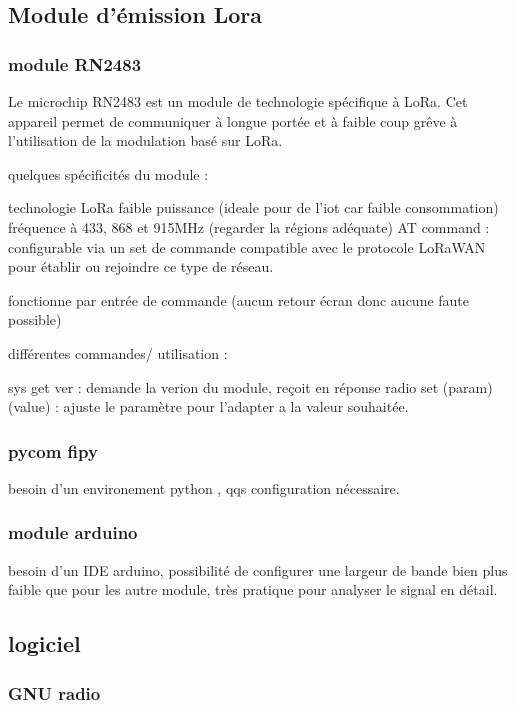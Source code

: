 \subsection{Module d'émission Lora}

\subsubsection{module RN2483}

Le microchip RN2483 est un module de technologie spécifique à LoRa. Cet appareil permet de communiquer à longue portée et à faible coup grêve à l'utilisation de la modulation basé sur LoRa.

quelques spécificités du module :

technologie LoRa
faible puissance (ideale pour de l'iot car faible consommation)
fréquence à 433, 868 et 915MHz (regarder la régions adéquate)
AT command : configurable via un set de commande
compatible avec le protocole LoRaWAN pour établir ou rejoindre ce type de réseau.

fonctionne par entrée de commande (aucun retour écran donc aucune faute possible)

différentes commandes/ utilisation :

sys get ver : demande la verion du module, reçoit en réponse 
radio set (param) (value) : ajuste le paramètre pour l'adapter a la valeur souhaitée.

\subsubsection{pycom fipy}

besoin  d'un environement python , qqs configuration nécessaire.

\subsubsection{module arduino}

besoin d'un IDE arduino, possibilité de configurer une largeur de bande bien plus faible que pour les autre module, très pratique pour analyser le signal en détail.

\subsection{logiciel}

\subsubsection{GNU radio}

